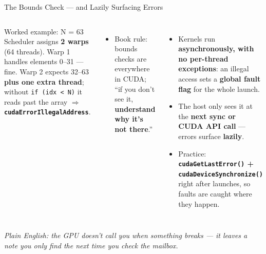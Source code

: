 \documentclass[aspectratio=169]{beamer}
\newcommand{\kw}[1]{\textbf{\textcolor{kwblue}{#1}}}
\newcommand{\pe}[1]{{\footnotesize\itshape Plain English: #1}}
\begin{document}
\begin{frame}{The Bounds Check --- and Lazily Surfacing Errors}
  \begin{columns}[t]
    \begin{block}{Worked example: N = 63}
      \small Scheduler assigns \kw{2 warps} (64 threads). Warp 1 handles elements 0--31 --- fine.
      Warp 2 expects 32--63 \kw{plus one extra thread}; without \texttt{if (idx < N)} it reads
      past the array $\Rightarrow$ \kw{\texttt{cudaErrorIllegalAddress}}.
    \end{block}
    \begin{itemize}\small
      \item Book rule: bounds checks are everywhere in CUDA; ``if you don't see it,
            \kw{understand why it's not there}.''
    \end{itemize}
    \begin{itemize}
      \item Kernels run \kw{asynchronously, with no per-thread exceptions}: an illegal access sets a
            \kw{global fault flag} for the whole launch.
      \item The host only sees it at the \kw{next sync or CUDA API call} --- errors surface
            \kw{lazily}.
      \item Practice: \kw{\texttt{cudaGetLastError()} + \texttt{cudaDeviceSynchronize()}}
            right after launches, so faults are caught where they happen.
    \end{itemize}
  \end{columns}
  \medskip
  \pe{the GPU doesn't call you when something breaks --- it leaves a note you only find the next time you check the mailbox.}
\end{frame}
\end{document}
